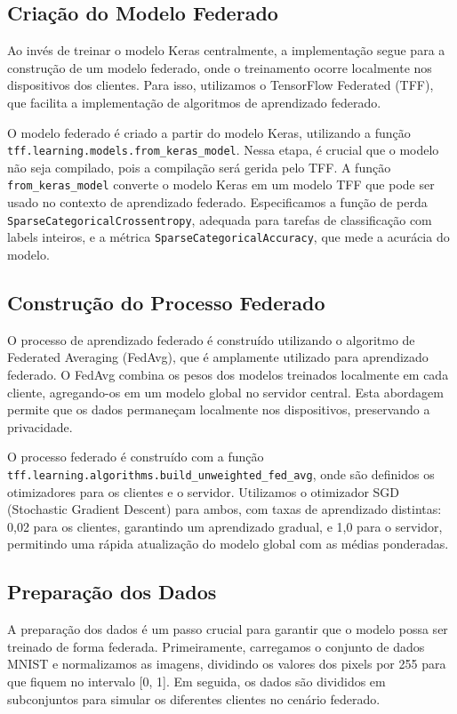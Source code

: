 \subsection{Criação do Modelo Federado}

Ao invés de treinar o modelo Keras centralmente, a implementação segue para a construção de um modelo federado, onde o treinamento ocorre localmente nos dispositivos dos clientes. Para isso, utilizamos o TensorFlow Federated (TFF), que facilita a implementação de algoritmos de aprendizado federado.

O modelo federado é criado a partir do modelo Keras, utilizando a função \texttt{tff.learning.models.from\_keras\_model}. Nessa etapa, é crucial que o modelo não seja compilado, pois a compilação será gerida pelo TFF. A função \texttt{from\_keras\_model} converte o modelo Keras em um modelo TFF que pode ser usado no contexto de aprendizado federado. Especificamos a função de perda \texttt{SparseCategoricalCrossentropy}, adequada para tarefas de classificação com labels inteiros, e a métrica \texttt{SparseCategoricalAccuracy}, que mede a acurácia do modelo.

\subsection{Construção do Processo Federado}

O processo de aprendizado federado é construído utilizando o algoritmo de Federated Averaging (FedAvg), que é amplamente utilizado para aprendizado federado. O FedAvg combina os pesos dos modelos treinados localmente em cada cliente, agregando-os em um modelo global no servidor central. Esta abordagem permite que os dados permaneçam localmente nos dispositivos, preservando a privacidade.

O processo federado é construído com a função \texttt{tff.learning.algorithms.build\_unweighted\_fed\_avg}, onde são definidos os otimizadores para os clientes e o servidor. Utilizamos o otimizador SGD (Stochastic Gradient Descent) para ambos, com taxas de aprendizado distintas: 0,02 para os clientes, garantindo um aprendizado gradual, e 1,0 para o servidor, permitindo uma rápida atualização do modelo global com as médias ponderadas.

\subsection{Preparação dos Dados}

A preparação dos dados é um passo crucial para garantir que o modelo possa ser treinado de forma federada. Primeiramente, carregamos o conjunto de dados MNIST e normalizamos as imagens, dividindo os valores dos pixels por 255 para que fiquem no intervalo {[}0, 1{]}. Em seguida, os dados são divididos em subconjuntos para simular os diferentes clientes no cenário federado.

